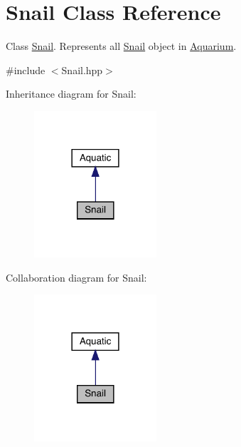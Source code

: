 \hypertarget{class_snail}{}\section{Snail Class Reference}
\label{class_snail}


Class \mbox{\hyperlink{class_snail}{Snail}}. Represents all \mbox{\hyperlink{class_snail}{Snail}} object in \mbox{\hyperlink{class_aquarium}{Aquarium}}.  




{\ttfamily \#include $<$Snail.\+hpp$>$}



Inheritance diagram for Snail\+:\nopagebreak
\begin{figure}[H]
\begin{center}
\leavevmode
\includegraphics[width=129pt]{class_snail__inherit__graph}
\end{center}
\end{figure}


Collaboration diagram for Snail\+:\nopagebreak
\begin{figure}[H]
\begin{center}
\leavevmode
\includegraphics[width=129pt]{class_snail__coll__graph}
\end{center}
\end{figure}
